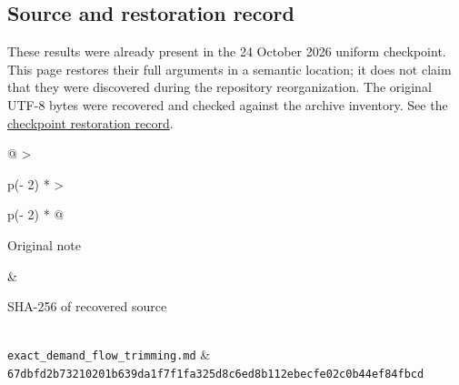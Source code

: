 \hypertarget{af-32c0fc642d-source-and-restoration-record}{%
\subsection{Source and restoration record}\label{af-32c0fc642d-source-and-restoration-record}}

These results were already present in the 24 October 2026 uniform checkpoint. This page restores their full arguments in a semantic location; it does not claim that they were discovered during the repository reorganization. The original UTF-8 bytes were recovered and checked against the archive inventory. See the \href{https://github.com/icekylinx/algorithm-frontier/blob/main/provenance/checkpoint-restoration.md}{checkpoint restoration record}.

\begin{longtable}[]{@{}
  >{\raggedright\arraybackslash}p{(\columnwidth - 2\tabcolsep) * }
  >{\raggedright\arraybackslash}p{(\columnwidth - 2\tabcolsep) * }@{}}
\toprule\noalign{}
\begin{minipage}[b]{\linewidth}\raggedright
Original note
\end{minipage} & \begin{minipage}[b]{\linewidth}\raggedright
SHA-256 of recovered source
\end{minipage} \\
\midrule\noalign{}
\endhead
\bottomrule\noalign{}
\endlastfoot
\texttt{exact\_demand\_flow\_trimming.md} & \texttt{67dbfd2b73210201b639da1f7f1fa325d8c6ed8b112ebecfe02c0b44ef84fbcd} \\
\end{longtable}
